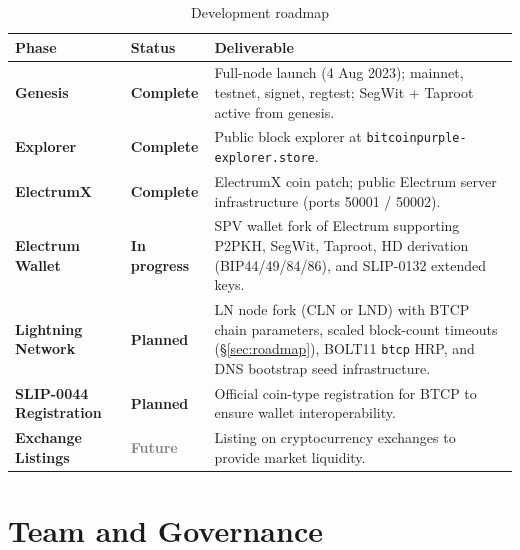 \documentclass[12pt, a4paper]{article}
\begin{document}
\begin{table}[h!]
\centering
\caption{Development roadmap}
\begin{tabularx}{\textwidth}{@{}llX@{}}
\toprule
\textbf{Phase} & \textbf{Status} & \textbf{Deliverable} \\
\midrule
\textbf{Genesis}    & \textcolor{green!60!black}{\textbf{Complete}} &
  Full-node launch (4 Aug 2023); mainnet, testnet, signet, regtest;
  SegWit + Taproot active from genesis. \\[4pt]

\textbf{Explorer}   & \textcolor{green!60!black}{\textbf{Complete}} &
  Public block explorer at \texttt{bitcoinpurple-explorer.store}. \\[4pt]

\textbf{ElectrumX}  & \textcolor{green!60!black}{\textbf{Complete}} &
  ElectrumX coin patch; public Electrum server infrastructure
  (ports 50001 / 50002). \\[4pt]

\textbf{Electrum Wallet} & \textcolor{orange!80!black}{\textbf{In progress}} &
  SPV wallet fork of Electrum supporting P2PKH, SegWit, Taproot,
  HD derivation (BIP44/49/84/86), and SLIP-0132 extended keys. \\[4pt]

\textbf{Lightning Network} & \textcolor{orange!80!black}{\textbf{Planned}} &
  LN node fork (CLN or LND) with BTCP chain parameters,
  scaled block-count timeouts (\S\ref{sec:roadmap}), BOLT11 \texttt{btcp} HRP,
  and DNS bootstrap seed infrastructure. \\[4pt]

\textbf{SLIP-0044 Registration} & \textcolor{orange!80!black}{\textbf{Planned}} &
  Official coin-type registration for BTCP to ensure wallet
  interoperability. \\[4pt]

\textbf{Exchange Listings} & \textcolor{gray}{\textbf{Future}} &
  Listing on cryptocurrency exchanges to provide market liquidity. \\
\bottomrule
\end{tabularx}
\end{table}

\newpage
\section{Team and Governance}
\end{document}
